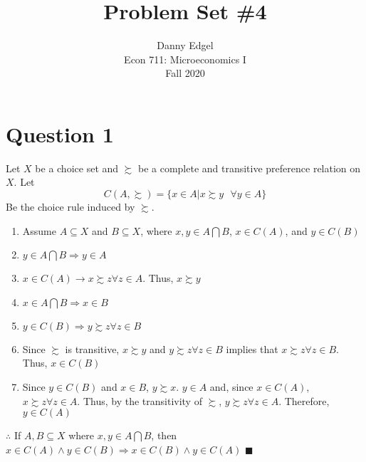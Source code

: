 \documentclass{article}
\newcommand{\intersect}{\bigcap}
\begin{document}
\title{	Problem Set \#4 }
\author{ 	Danny Edgel 					\\ 
			Econ 711: Microeconomics I		\\
			Fall 2020						\\
		}
\maketitle\thispagestyle{empty}



\section*{Question 1}
Let $X$ be a choice set and $\succsim$ be a complete and transitive preference relation on $X$. Let 
\[
	C(A,\succsim) = \{x\in A | x\succsim y \text{ } \forall y\in A\}
\]
Be the choice rule induced by $\succsim$.
\begin{enumerate}
	\item Assume $A\subseteq X$ and $B \subseteq X$, where $x,y\in A\intersect B$, $x\in C(A)$, and $y\in C(B)$
	
	\item $y\in A\intersect B\Rightarrow y\in A$
	
	\item $x\in C(A) \rightarrow x\succsim z \forall z\in A$. Thus, $x\succsim y$ 
	
	\item $x \in A\intersect B\Rightarrow x\in B$ 
	
	\item $y\in C(B)\Rightarrow y\succsim z \forall z\in B$
	
	\item Since $\succsim$ is transitive, $x\succsim y$ and $y\succsim z\forall z \in B$ implies that $x\succsim z\forall z \in B$. Thus, $x\in C(B)$
	
	\item Since $y\in C(B)$ and $x\in B$, $y\succsim x$. $y\in A$ and, since $x\in C(A)$, $x\succsim z\forall z\in A$. Thus, by the transitivity of $\succsim$, $y\succsim z\forall z\in A$. Therefore, $y\in C(A)$
	
\end{enumerate}
$\therefore$ If $A,B\subseteq X$ where $x,y\in A\intersect B$, then $x\in C(A)\land y\in C(B)\Rightarrow x\in C(B)\land y\in C(A)$ $\blacksquare$
\end{document}
